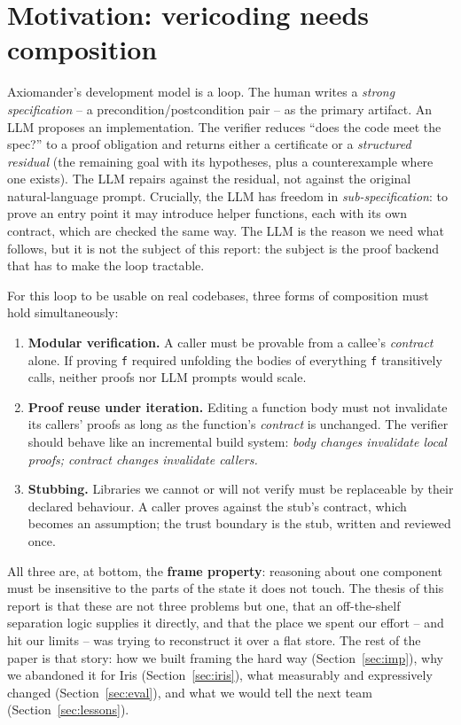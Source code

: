 \documentclass[sigconf,nonacm]{acmart}
\newcommand{\code}[1]{\texttt{#1}}
\begin{document}
\section{Motivation: vericoding needs composition}
\label{sec:motivation}

Axiomander's development model is a loop. The human writes a \emph{strong
specification} -- a precondition/postcondition pair -- as the primary artifact.
An LLM proposes an implementation. The verifier reduces ``does the code meet the
spec?'' to a proof obligation and returns either a certificate or a
\emph{structured residual} (the remaining goal with its hypotheses, plus a
counterexample where one exists). The LLM repairs against the residual, not
against the original natural-language prompt. Crucially, the LLM has freedom in
\emph{sub-specification}: to prove an entry point it may introduce helper
functions, each with its own contract, which are checked the same way. The LLM is
the reason we need what follows, but it is not the subject of this report: the
subject is the proof backend that has to make the loop tractable.

For this loop to be usable on real codebases, three forms of composition must
hold simultaneously:

\begin{enumerate}
  \item \textbf{Modular verification.} A caller must be provable from a callee's
  \emph{contract} alone. If proving \code{f} required unfolding the bodies of
  everything \code{f} transitively calls, neither proofs nor LLM prompts would
  scale.
  \item \textbf{Proof reuse under iteration.} Editing a function body must not
  invalidate its callers' proofs as long as the function's \emph{contract} is
  unchanged. The verifier should behave like an incremental build system:
  \emph{body changes invalidate local proofs; contract changes invalidate
  callers.}
  \item \textbf{Stubbing.} Libraries we cannot or will not verify must be
  replaceable by their declared behaviour. A caller proves against the stub's
  contract, which becomes an assumption; the trust boundary is the stub, written
  and reviewed once.
\end{enumerate}

All three are, at bottom, the \textbf{frame property}: reasoning about one
component must be insensitive to the parts of the state it does not touch. The
thesis of this report is that these are not three problems but one, that an
off-the-shelf separation logic supplies it directly, and that the place we spent
our effort -- and hit our limits -- was trying to reconstruct it over a flat
store. The rest of the paper is that story: how we built framing the hard way
(Section~\ref{sec:imp}), why we abandoned it for Iris (Section~\ref{sec:iris}),
what measurably and expressively changed (Section~\ref{sec:eval}), and what we
would tell the next team (Section~\ref{sec:lessons}).
\end{document}
